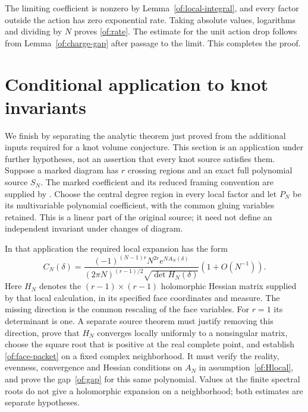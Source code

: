 \documentclass[11pt]{article}
\numberwithin{equation}{section}
\theoremstyle{definition}\newtheorem{definition}[theorem]{Definition}
\theoremstyle{remark}\newtheorem{remark}[theorem]{Remark}
\begin{document}
The limiting coefficient is nonzero by
Lemma~\ref{of:local-integral}, and every factor outside the action
has zero exponential rate. Taking absolute values, logarithms and
dividing by $N$ proves \eqref{of:rate}. The estimate for the unit
action drop follows from Lemma~\ref{of:charge-gap} after passage
to the limit. This completes the proof.

\section{Conditional application to knot invariants}

We finish by separating the analytic theorem just proved from the
additional inputs required for a knot volume conjecture. This section
is an application under further hypotheses, not an assertion that
every knot source satisfies them. Suppose a marked diagram has $r$ crossing
regions and an exact full polynomial source $S_N$. The marked coefficient
and its reduced framing convention are supplied by
\cite[Theorems 9.1 and 10.1, Corollary 9.2]{FinitePaper}.
Choose the central degree
region in every local factor and let $P_N$ be its multivariable polynomial coefficient, with the common gluing
variables retained.
This is a linear part of the original source; it need not define an
independent invariant under changes of diagram.

In that application the required local expansion has the form
\begin{equation}\label{of:face-packet}
 C_N(\delta)=
 \frac{(-1)^{(N-1)r}N^{2r}e^{NA_N(\delta)}}
 {(2\pi N)^{(r-1)/2}\sqrt{\det H_N(\delta)}}
                          (1+O(N^{-1})).
\end{equation}
Here $H_N$ denotes the $(r-1)\times(r-1)$ holomorphic Hessian
matrix supplied by that local calculation, in its specified face
coordinates and measure. The missing direction is the common
rescaling of the face variables. For $r=1$ its determinant is one.
A separate source theorem must justify removing this direction,
prove that $H_N$ converges locally uniformly to a nonsingular matrix,
choose the square root that is positive at the real complete point,
and establish \eqref{of:face-packet} on a fixed complex neighborhood.
It must verify the reality, evenness, convergence and Hessian
conditions on $A_N$ in assumption~\ref{of:Hlocal}, and prove the
gap~\eqref{of:gap} for this same polynomial. Values at the finite spectral roots do not give a holomorphic
expansion on a neighborhood; both estimates are separate hypotheses.
\end{document}
